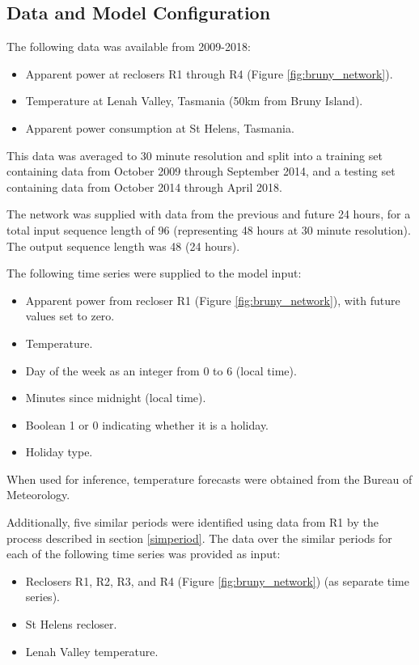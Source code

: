 \subsection{Data and  Model Configuration}
The following data was available from 2009-2018:
\begin{itemize}
	\item Apparent power at reclosers R1 through R4 (Figure \ref{fig:bruny_network}).
	\item Temperature at Lenah Valley, Tasmania (50km from Bruny Island). 
	\item Apparent power consumption at St Helens, Tasmania.
\end{itemize}

This data was averaged to 30 minute resolution and split into a training set containing data from October 2009 through September 2014, and a testing set containing data from October 2014 through April 2018.

The network was supplied with data from the previous and future 24 hours, for a total input sequence length of 96 (representing 48 hours at 30 minute resolution).
The output sequence length was 48 (24 hours).

The following time series were supplied to the model input:
\begin{itemize}
	\item Apparent power from recloser R1 (Figure \ref{fig:bruny_network}), with future values set to zero.
	\item Temperature.
	\item Day of the week as an integer from 0 to 6 (local time).
	\item Minutes since midnight (local time).
	\item Boolean 1 or 0 indicating whether it is a holiday.
	\item Holiday type.
\end{itemize}

When used for inference, temperature forecasts were obtained from the Bureau of Meteorology.

Additionally, five similar periods were identified using data from R1 by the process described in section \ref{simperiod}.
The data over the similar periods for each of the following time series was provided as input:
\begin{itemize}
	\item Reclosers R1, R2, R3, and R4 (Figure \ref{fig:bruny_network}) (as separate time series).
	\item St Helens recloser.
	\item Lenah Valley temperature.
\end{itemize}

